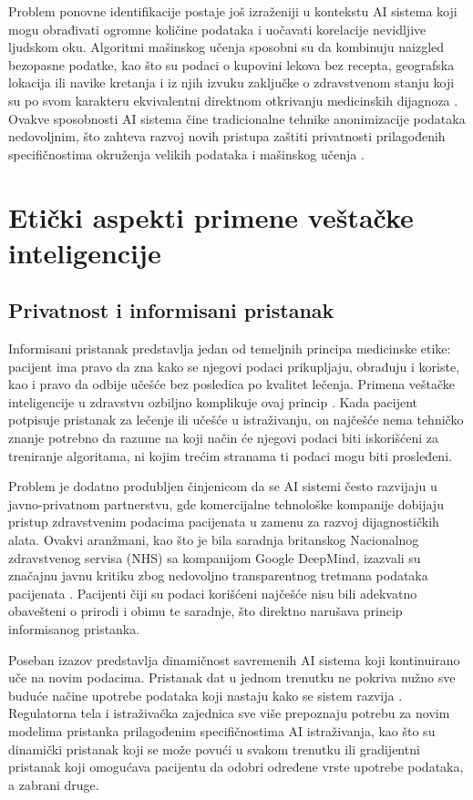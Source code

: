 \documentclass[12pt]{article}
\begin{document}
Problem ponovne identifikacije postaje još izraženiji u kontekstu AI sistema koji mogu obrađivati ogromne količine podataka i uočavati korelacije nevidljive ljudskom oku. Algoritmi mašinskog učenja sposobni su da kombinuju naizgled bezopasne podatke, kao što su podaci o kupovini lekova bez recepta, geografska lokacija ili navike kretanja i iz njih izvuku zaključke o zdravstvenom stanju koji su po svom karakteru ekvivalentni direktnom otkrivanju medicinskih dijagnoza \cite{murdoch2021}. 
Ovakve sposobnosti AI sistema čine tradicionalne tehnike anonimizacije podataka nedovoljnim, što zahteva razvoj novih pristupa zaštiti privatnosti prilagođenih specifičnostima okruženja velikih podataka i mašinskog učenja \cite{kumar2025}.
 
\newpage
\section{Etički aspekti primene veštačke inteligencije}
\subsection{Privatnost i informisani pristanak}
Informisani pristanak predstavlja jedan od temeljnih principa medicinske etike: pacijent ima pravo da zna kako se njegovi podaci prikupljaju, obrađuju i koriste, kao i pravo da odbije učešće bez posledica po kvalitet lečenja. Primena veštačke inteligencije u zdravstvu ozbiljno komplikuje ovaj princip \cite{murdoch2021}. Kada pacijent potpisuje pristanak za lečenje ili učešće u istraživanju, on najčešće nema tehničko znanje potrebno da razume na koji način će njegovi podaci biti iskorišćeni za treniranje algoritama, ni kojim trećim stranama ti podaci mogu biti prosleđeni.
 
Problem je dodatno produbljen činjenicom da se AI sistemi često razvijaju u javno-privatnom partnerstvu, gde komercijalne tehnološke kompanije dobijaju pristup zdravstvenim podacima pacijenata u zamenu za razvoj dijagnostičkih alata. Ovakvi aranžmani, kao što je bila saradnja britanskog Nacionalnog zdravstvenog servisa (NHS) sa kompanijom Google DeepMind, izazvali su značajnu javnu kritiku zbog nedovoljno transparentnog tretmana podataka pacijenata \cite{kumar2025}. Pacijenti 
čiji su podaci korišćeni najčešće nisu bili adekvatno obavešteni o prirodi i obimu te saradnje, što direktno narušava princip informisanog pristanka.
 
Poseban izazov predstavlja dinamičnost savremenih AI sistema koji kontinuirano uče na novim podacima. Pristanak dat u jednom trenutku ne pokriva nužno sve buduće načine upotrebe podataka koji nastaju kako se sistem razvija \cite{murdoch2021}. Regulatorna tela i istraživačka zajednica sve više prepoznaju potrebu za novim modelima pristanka prilagođenim specifičnostima AI istraživanja, kao što su 
dinamički pristanak koji se može povući u svakom trenutku ili gradijentni pristanak koji omogućava pacijentu da odobri određene vrste upotrebe podataka, a zabrani druge.
 
\end{document}
